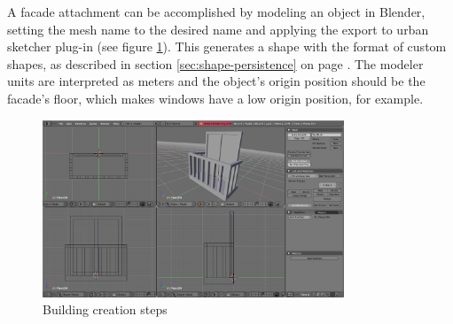 A facade attachment can be accomplished by modeling an object in Blender,
setting the mesh name to the desired name and applying the export to urban sketcher plug-in 
(see figure \ref{fig:blender-attachment}).
This generates a shape with the format of custom shapes, as described in section \ref{sec:shape-persistence}
on page \pageref{sec:shape-persistence}.
The modeler units are interpreted as meters and the object's origin position should be the facade's floor,
which makes windows have a low origin position, for example.

\begin{figure}[!ht]
		\centering
		\includegraphics[width=9cm]{gfx/blender-attachment.png}
		\caption{Building creation steps}
		\label{fig:blender-attachment}
\end{figure}





